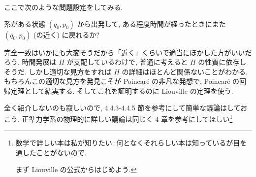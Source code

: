 \documentclass[openany, a4paper, oneside]{jsbook}
\begin{document}
ここで次のような問題設定をしてみる.
\begin{problem}
系がある状態 $(q_0, p_0)$ から出発して,
ある程度時間が経ったときにまた $(q_0, p_0)$ (の近く) に戻れるか?
\end{problem}
完全一致はいかにも大変そうだから「近く」くらいで適当にぼかした方がいいだろう.
時間発展は $H$ が支配しているわけで,
普通に考えると $H$ の性質に依存しそうだ.
しかし適切な見方をすれば $H$ の詳細はほとんど関係ないことがわかる.
もちろんこの適切な見方を発見こそが Poincar\'e の非凡な発想で,
Poincar\'e の回帰定理として結実する.
そしてこれを証明するのに Liouville の定理を使う.

全く紹介しないのも寂しいので,
\cite{NakamuraYamamoto1} 4.4.3-4.4.5 節を参考にして簡単な議論はしておこう.
正準力学系の物理的に詳しい議論は同じく \cite{NakamuraYamamoto1} 4 章を参考にしてほしい\footnote{数学で詳しい本は私が知りたい.
何となくそれらしい本は知っているが目を通したことがないので.

まず Liouville の公式からはじめよう\footnotemark.}
\end{document}
